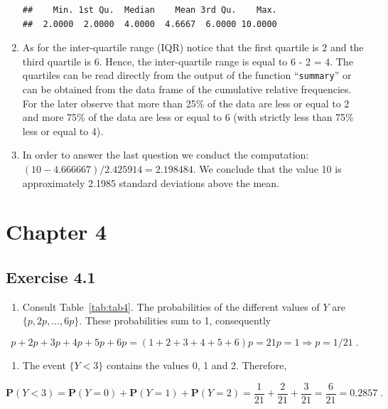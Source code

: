 \documentclass[]{krantz}
\providecommand{\tightlist}{%
  \setlength{\itemsep}{0pt}\setlength{\parskip}{0pt}}
\newcommand{\Prob}{\mathbf{P}}
\theoremstyle{definition}
\theoremstyle{definition}
\theoremstyle{definition}
\theoremstyle{remark}
\begin{document}
\begin{enumerate}
\begin{verbatim}
##    Min. 1st Qu.  Median    Mean 3rd Qu.    Max. 
##  2.0000  2.0000  4.0000  4.6667  6.0000 10.0000
\end{verbatim}
\item
  As for the inter-quartile
  range (IQR) notice that the first quartile is 2 and the third quartile
  is 6. Hence, the inter-quartile range is equal to 6 - 2 = 4. The
  quartiles can be read directly from the output of the function
  ``\texttt{summary}'' or can be obtained from the data frame of the cumulative
  relative frequencies. For the later observe that more than 25\% of the
  data are less or equal to 2 and more 75\% of the data are less or equal
  to 6 (with strictly less than 75\% less or equal to 4).
\item
  In order to answer the last
  question we conduct the computation:
  \((10 - 4.666667)/2.425914 = 2.198484\). We conclude that the value 10 is
  approximately 2.1985 standard deviations above the mean.
\end{enumerate}

\hypertarget{chapter-4}{%
\section*{Chapter 4}\label{chapter-4}}


\hypertarget{exercise-4.1}{%
\subsection*{Exercise 4.1}\label{exercise-4.1}}


\begin{enumerate}
\def\labelenumi{\arabic{enumi}.}
\tightlist
\item
  Consult
  Table~\ref{tab:tab4}. The probabilities of the different values
  of \(Y\) are \(\{p, 2p, \ldots, 6p\}\). These probabilities sum to 1,
  consequently
\end{enumerate}

\[p + 2p + 3 p + 4 p + 5 p + 6p = (1+2+3+4+5+6)p = 21 p = 1 \Longrightarrow p = 1/21\;.\]

\begin{enumerate}
\def\labelenumi{\arabic{enumi}.}
\setcounter{enumi}{1}
\tightlist
\item
  The event \(\{Y < 3\}\) contains
  the values 0, 1 and 2. Therefore,
\end{enumerate}

\[\Prob(Y < 3) = \Prob(Y=0) + \Prob(Y=1) + \Prob(Y=2) = \frac{1}{21} + \frac{2}{21} + \frac{3}{21} = \frac{6}{21}= 0.2857\;.\]
\end{document}
